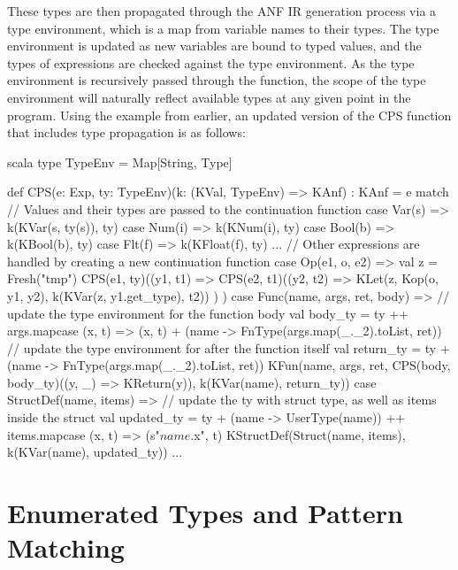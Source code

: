 These types are then propagated through the ANF IR generation process via a type environment, which
is a map from variable names to their types. The type environment is updated as new variables are
bound to typed values, and the types of expressions are checked against the type environment. As the
type environment is recursively passed through the function, the scope of the type environment will
naturally reflect available types at any given point in the program. Using the example from earlier,
an updated version of the CPS function that includes type propagation is as follows:

\begin{code}{scala}
    type TypeEnv = Map[String, Type]

    def CPS(e: Exp, ty: TypeEnv)(k: (KVal, TypeEnv) => KAnf) : KAnf = e match {
        // Values and their types are passed to the continuation function
        case Var(s) => k(KVar(s, ty(s)), ty)
        case Num(i) => k(KNum(i), ty)
        case Bool(b) => k(KBool(b), ty)
        case Flt(f) => k(KFloat(f), ty)
        ...
        // Other expressions are handled by creating a new continuation function
        case Op(e1, o, e2) => {
            val z = Fresh("tmp")
            CPS(e1, ty)((y1, t1) =>
                CPS(e2, t1)((y2, t2) =>
                    KLet(z, Kop(o, y1, y2), k(KVar(z, y1.get_type), t2))
                )
            )
        }
        case Func(name, args, ret, body) => {
            // update the type environment for the function body
            val body_ty = ty
                ++ args.map{case (x, t) => (x, t)}
                + (name -> FnType(args.map(_._2).toList, ret))
            // update the type environment for after the function itself
            val return_ty = ty
                + (name -> FnType(args.map(_._2).toList, ret))
            KFun(name, args, ret, CPS(body, body_ty)((y, _) => KReturn(y)), k(KVar(name), return_ty))
        }
        case StructDef(name, items) =>
            // update the ty with struct type, as well as items inside the struct
            val updated_ty = ty
                + (name -> UserType(name))
                ++ items.map{case (x, t) => (s"$name.$x", t)}
            KStructDef(Struct(name, items), k(KVar(name), updated_ty))
        ...
    }
\end{code}



\section{Enumerated Types and Pattern Matching}

